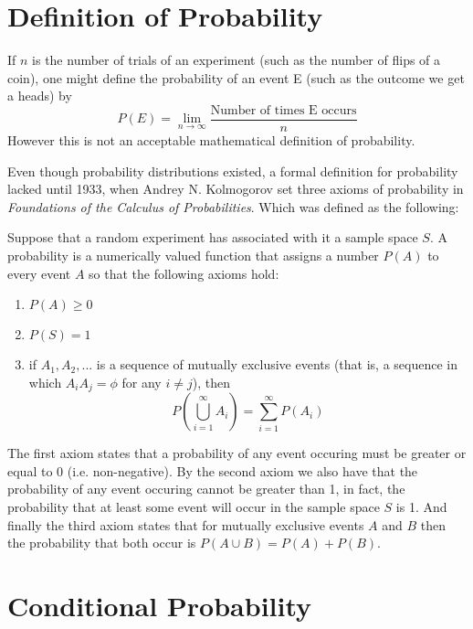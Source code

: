 \section{Definition of Probability}

If $n$ is the number of trials of an experiment (such as the number of flips of a coin), one might
define the probability of an event E (such as the outcome we get a heads) by
\begin{equation}
	P(E) = \lim_{n\to \infty}\frac {\textrm{Number of times E occurs}}{n}
\end{equation}
However this is not an acceptable mathematical definition of probability.

Even though probability distributions existed, a formal definition for probability lacked until 1933, when Andrey N. Kolmogorov set three axioms of probability
in \textit{Foundations of the Calculus of Probabilities}. Which was defined as the following: \newline

Suppose that a random experiment has associated with it a sample space $S$. A probability is a numerically valued
function that assigns a number $P(A)$ to every event $A$ so that the following axioms hold:
\begin{enumerate}
	\item $P(A)\geq 0$
	\item $P(S) = 1$
	\item if $A_1, A_2, ...$ is a sequence of mutually exclusive events (that is, a sequence in which $A_{i}A_{j}=\phi$ for
		any $i\neq j$), then
		\begin{equation}
			P\left ( \bigcup_{i=1}^{\infty} A_i\right )=\sum_{i=1}^{\infty}P(A_i)
		\end{equation}
\end{enumerate}\par

The first axiom states that a probability of any event occuring must be greater or equal to 0 (i.e. non-negative).
By the second axiom we also have that the probability of any event occuring cannot be greater than 1, in fact, the probability
that at least some event will occur in the sample space $S$ is 1. And finally the third axiom states that for mutually exclusive
events $A$ and $B$ then the probability that both occur is $P(A\cup B) = P(A)+P(B)$.

\section{Conditional Probability}

